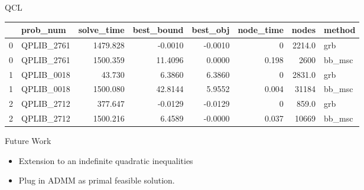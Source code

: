 \documentclass[aspectratio=1610, 9pt]{beamer}
\begin{document}
\begin{frame}[standout]{QCL}
  \begin{tabular}{llrrrrrl}
    \toprule
    {} & prob\_num   & solve\_time & best\_bound & best\_obj & node\_time & nodes  & method  \\
    \midrule
    0  & QPLIB\_2761 & 1479.828    & -0.0010     & -0.0010   & 0          & 2214.0 & grb     \\
    0  & QPLIB\_2761 & 1500.359    & 11.4096     & 0.0000    & 0.198      & 2600   & bb\_msc \\
    1  & QPLIB\_0018 & 43.730      & 6.3860      & 6.3860    & 0          & 2831.0 & grb     \\
    1  & QPLIB\_0018 & 1500.080    & 42.8144     & 5.9552    & 0.004      & 31184  & bb\_msc \\
    2  & QPLIB\_2712 & 377.647     & -0.0129     & -0.0129   & 0          & 859.0  & grb     \\
    2  & QPLIB\_2712 & 1500.216    & 6.4589      & -0.0000   & 0.037      & 10669  & bb\_msc \\
    \bottomrule
  \end{tabular}
\end{frame}


\setlength\pdfpagewidth{16.00cm}%
\setlength\pdfpageheight{10.00cm}%

\begin{frame}[allowframebreaks]{Future Work}
  \begin{itemize}
    \item Extension to an indefinite quadratic inequalities
    \item Plug in ADMM as primal feasible solution.
  \end{itemize}
\end{frame}
\end{document}
